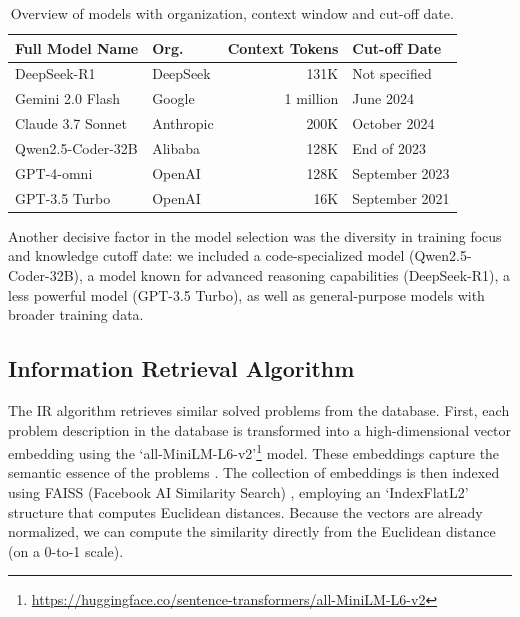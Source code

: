 \documentclass[preprint,12pt]{elsarticle}
\begin{document}
\begin{table}[h]
\centering
\caption{Overview of models with organization, context window and cut-off date.}
\label{tab:models}
\begin{tabular}{p{4.4cm} p{1.5cm} r p{2.85cm}}
\toprule
\textbf{Full Model Name} & \textbf{Org.} & \textbf{Context Tokens} & \textbf{Cut-off Date} \\
\midrule
DeepSeek-R1 \cite{deepseek2025deepseekr1} & DeepSeek & 131K & Not specified \\
Gemini 2.0 Flash \cite{deepmind2025gemini2flash} & Google & 1 million & June 2024 \\
Claude 3.7 Sonnet \cite{anthropic2025claude37sonnet} & Anthropic & 200K & October 2024 \\
Qwen2.5-Coder-32B \cite{alibaba2025qwenmax} & Alibaba & 128K & End of 2023 \\
GPT-4-omni \cite{openai2024gpt4ocard} & OpenAI & 128K & September 2023 \\
GPT-3.5 Turbo \cite{openai2024gpt35turbo} & OpenAI & 16K & September 2021 \\
\bottomrule
\end{tabular}
\end{table}

Another decisive factor in the model selection was the diversity in training focus and knowledge cutoff date: we included a code-specialized model (Qwen2.5-Coder-32B), a model known for advanced reasoning capabilities (DeepSeek-R1), a less powerful model (GPT-3.5 Turbo), as well as general-purpose models with broader training data.

\subsection{Information Retrieval Algorithm}
\label{subsec:ir}

The IR algorithm retrieves similar solved problems from the database. First, each problem description in the database is transformed into a high-dimensional vector embedding using the `all-MiniLM-L6-v2'\footnote{\url{https://huggingface.co/sentence-transformers/all-MiniLM-L6-v2}} model. These embeddings capture the semantic essence of the problems \cite{embeddings}. The collection of embeddings is then indexed using FAISS (Facebook AI Similarity Search) \cite{FAISS_Johnson2017}, employing an `IndexFlatL2' structure that computes Euclidean distances. Because the vectors are already normalized, we can compute the similarity directly from the Euclidean distance (on a 0-to-1 scale).
\end{document}
